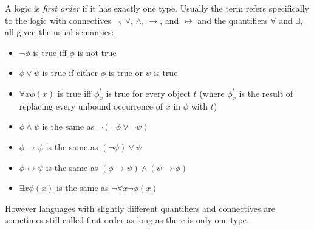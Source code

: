 \documentclass[12pt]{article}
\begin{document}
A logic is \emph{first order} if it has exactly one type.  Usually the term refers specifically to the logic with connectives $\neg$, $\vee$, $\wedge$, $\rightarrow$, and $\leftrightarrow$ and the quantifiers $\forall$ and $\exists$, all given the usual semantics:

\begin{itemize}
\item $\neg\phi$ is true iff $\phi$ is not true

\item $\phi\vee\psi$ is true if either $\phi$ is true or $\psi$ is true

\item $\forall x\phi(x)$ is true iff $\phi^t_x$ is true for every object $t$ (where $\phi^t_x$ is the result of replacing every unbound occurrence of $x$ in $\phi$ with $t$)

\item $\phi\wedge\psi$ is the same as $\neg(\neg\phi\vee\neg\psi)$

\item $\phi\rightarrow\psi$ is the same as $(\neg\phi)\vee\psi$

\item $\phi\leftrightarrow\psi$ is the same as $(\phi\rightarrow\psi)\wedge(\psi\rightarrow\phi)$

\item $\exists x\phi(x)$ is the same as $\neg\forall x\neg\phi(x)$
\end{itemize}

However languages with slightly different quantifiers and connectives are sometimes still called first order as long as there is only one type.
\end{document}
